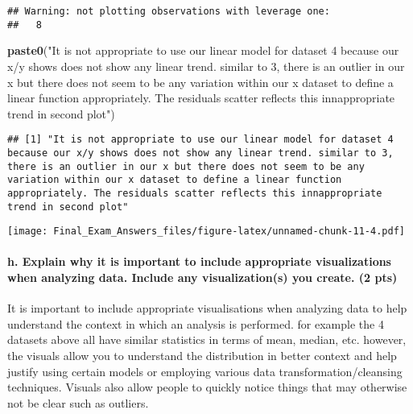 \documentclass[
]{article}
\newenvironment{Shaded}{\begin{snugshade}}{\end{snugshade}}
\newcommand{\KeywordTok}[1]{\textcolor[rgb]{0.13,0.29,0.53}{\textbf{#1}}}
\newcommand{\NormalTok}[1]{#1}
\newcommand{\StringTok}[1]{\textcolor[rgb]{0.31,0.60,0.02}{#1}}
\begin{document}
\begin{verbatim}
## Warning: not plotting observations with leverage one:
##   8
\end{verbatim}

\begin{Shaded}
\begin{Highlighting}[]
\KeywordTok{paste0}\NormalTok{(}\StringTok{"It is not appropriate to use our linear model for dataset 4 because our x/y shows does not show any linear trend. similar to 3, there is an outlier in our x but there does not seem to be any variation within our x dataset to define a linear function appropriately. The residuals scatter reflects this innappropriate trend in second plot"}\NormalTok{)}
\end{Highlighting}
\end{Shaded}

\begin{verbatim}
## [1] "It is not appropriate to use our linear model for dataset 4 because our x/y shows does not show any linear trend. similar to 3, there is an outlier in our x but there does not seem to be any variation within our x dataset to define a linear function appropriately. The residuals scatter reflects this innappropriate trend in second plot"
\end{verbatim}

\texttt{[image: Final\_Exam\_Answers\_files/figure-latex/unnamed-chunk-11-4.pdf]}

\hypertarget{h.-explain-why-it-is-important-to-include-appropriate-visualizations-when-analyzing-data.-include-any-visualizations-you-create.-2-pts}{%
\paragraph{h. Explain why it is important to include appropriate
visualizations when analyzing data. Include any visualization(s) you
create. (2
pts)}\label{h.-explain-why-it-is-important-to-include-appropriate-visualizations-when-analyzing-data.-include-any-visualizations-you-create.-2-pts}}

It is important to include appropriate visualisations when analyzing
data to help understand the context in which an analysis is performed.
for example the 4 datasets above all have similar statistics in terms of
mean, median, etc. however, the visuals allow you to understand the
distribution in better context and help justify using certain models or
employing various data transformation/cleansing techniques. Visuals also
allow people to quickly notice things that may otherwise not be clear
such as outliers.
\end{document}

